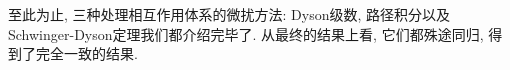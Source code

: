 至此为止, 三种处理相互作用体系的微扰方法: Dyson级数, 路径积分以及Schwinger-Dyson定理我们都介绍完毕了. 从最终的结果上看, 它们都殊途同归, 得到了完全一致的结果.



\newpage
